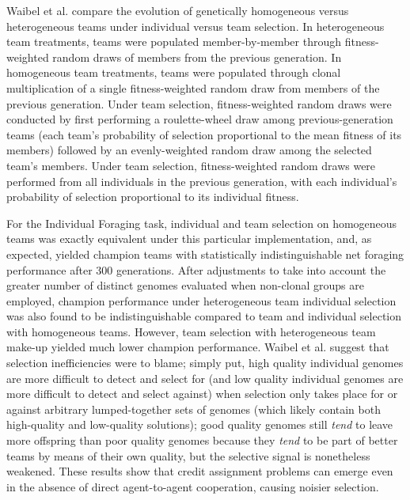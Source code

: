 Waibel et al. compare the evolution of genetically homogeneous versus heterogeneous teams under individual versus team selection.
In heterogeneous team treatments, teams were populated member-by-member through fitness-weighted random draws of members from the previous generation.
In homogeneous team treatments, teams were populated through clonal multiplication of a single fitness-weighted random draw from members of the previous generation.
Under team selection, fitness-weighted random draws were conducted by first performing a roulette-wheel draw among previous-generation teams (each team's probability of selection proportional to the mean fitness of its members) followed by an evenly-weighted random draw among the selected team's members.
Under team selection, fitness-weighted random draws were performed from all individuals in the previous generation, with each individual's probability of selection proportional to its individual fitness.

For the Individual Foraging task, individual and team selection on homogeneous teams was exactly equivalent under this particular implementation, and, as expected, yielded champion teams with statistically indistinguishable net foraging performance after 300 generations.
After adjustments to take into account the greater number of distinct genomes evaluated when non-clonal groups are employed, champion performance under heterogeneous team individual selection was also found to be indistinguishable compared to team and individual selection with homogeneous teams.
However, team selection with heterogeneous team make-up yielded much lower champion performance.
Waibel et al. suggest that selection inefficiencies were to blame; simply put, high quality individual genomes are more difficult to detect and select for (and low quality individual genomes are more difficult to detect and select against) when selection only takes place for or against arbitrary lumped-together sets of genomes (which likely contain both high-quality and low-quality solutions);
good quality genomes still \textit{tend} to leave more offspring than poor quality genomes because they \textit{tend} to be part of better teams by means of their own quality, but the selective signal is nonetheless weakened.
These results show that credit assignment problems can emerge even in the absence of direct agent-to-agent cooperation, causing noisier selection.

